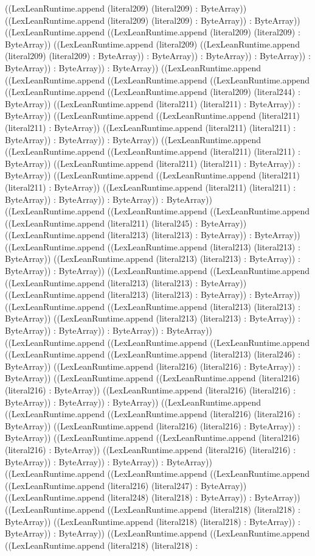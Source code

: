 \documentclass[11pt]{article}
\begin{document}
((LexLeanRuntime.append (literal209) (literal209) : ByteArray)) ((LexLeanRuntime.append (literal209) (literal209) : ByteArray)) : ByteArray)) ((LexLeanRuntime.append ((LexLeanRuntime.append (literal209) (literal209) : ByteArray)) ((LexLeanRuntime.append (literal209) ((LexLeanRuntime.append (literal209) (literal209) : ByteArray)) : ByteArray)) : ByteArray)) : ByteArray)) : ByteArray)) : ByteArray)) : ByteArray)) ((LexLeanRuntime.append ((LexLeanRuntime.append ((LexLeanRuntime.append ((LexLeanRuntime.append ((LexLeanRuntime.append ((LexLeanRuntime.append (literal209) (literal244) : ByteArray)) ((LexLeanRuntime.append (literal211) (literal211) : ByteArray)) : ByteArray)) ((LexLeanRuntime.append ((LexLeanRuntime.append (literal211) (literal211) : ByteArray)) ((LexLeanRuntime.append (literal211) (literal211) : ByteArray)) : ByteArray)) : ByteArray)) ((LexLeanRuntime.append ((LexLeanRuntime.append ((LexLeanRuntime.append (literal211) (literal211) : ByteArray)) ((LexLeanRuntime.append (literal211) (literal211) : ByteArray)) : ByteArray)) ((LexLeanRuntime.append ((LexLeanRuntime.append (literal211) (literal211) : ByteArray)) ((LexLeanRuntime.append (literal211) (literal211) : ByteArray)) : ByteArray)) : ByteArray)) : ByteArray)) ((LexLeanRuntime.append ((LexLeanRuntime.append ((LexLeanRuntime.append ((LexLeanRuntime.append (literal211) (literal245) : ByteArray)) ((LexLeanRuntime.append (literal213) (literal213) : ByteArray)) : ByteArray)) ((LexLeanRuntime.append ((LexLeanRuntime.append (literal213) (literal213) : ByteArray)) ((LexLeanRuntime.append (literal213) (literal213) : ByteArray)) : ByteArray)) : ByteArray)) ((LexLeanRuntime.append ((LexLeanRuntime.append ((LexLeanRuntime.append (literal213) (literal213) : ByteArray)) ((LexLeanRuntime.append (literal213) (literal213) : ByteArray)) : ByteArray)) ((LexLeanRuntime.append ((LexLeanRuntime.append (literal213) (literal213) : ByteArray)) ((LexLeanRuntime.append (literal213) (literal213) : ByteArray)) : ByteArray)) : ByteArray)) : ByteArray)) : ByteArray)) ((LexLeanRuntime.append ((LexLeanRuntime.append ((LexLeanRuntime.append ((LexLeanRuntime.append ((LexLeanRuntime.append (literal213) (literal246) : ByteArray)) ((LexLeanRuntime.append (literal216) (literal216) : ByteArray)) : ByteArray)) ((LexLeanRuntime.append ((LexLeanRuntime.append (literal216) (literal216) : ByteArray)) ((LexLeanRuntime.append (literal216) (literal216) : ByteArray)) : ByteArray)) : ByteArray)) ((LexLeanRuntime.append ((LexLeanRuntime.append ((LexLeanRuntime.append (literal216) (literal216) : ByteArray)) ((LexLeanRuntime.append (literal216) (literal216) : ByteArray)) : ByteArray)) ((LexLeanRuntime.append ((LexLeanRuntime.append (literal216) (literal216) : ByteArray)) ((LexLeanRuntime.append (literal216) (literal216) : ByteArray)) : ByteArray)) : ByteArray)) : ByteArray)) ((LexLeanRuntime.append ((LexLeanRuntime.append ((LexLeanRuntime.append ((LexLeanRuntime.append (literal216) (literal247) : ByteArray)) ((LexLeanRuntime.append (literal248) (literal218) : ByteArray)) : ByteArray)) ((LexLeanRuntime.append ((LexLeanRuntime.append (literal218) (literal218) : ByteArray)) ((LexLeanRuntime.append (literal218) (literal218) : ByteArray)) : ByteArray)) : ByteArray)) ((LexLeanRuntime.append ((LexLeanRuntime.append ((LexLeanRuntime.append (literal218) (literal218) : 
\end{document}
